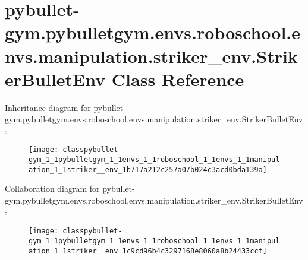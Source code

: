 \hypertarget{classpybullet-gym_1_1pybulletgym_1_1envs_1_1roboschool_1_1envs_1_1manipulation_1_1striker__env_1_1_striker_bullet_env}{}\section{pybullet-\/gym.pybulletgym.\+envs.\+roboschool.\+envs.\+manipulation.\+striker\+\_\+env.\+Striker\+Bullet\+Env Class Reference}
\label{classpybullet-gym_1_1pybulletgym_1_1envs_1_1roboschool_1_1envs_1_1manipulation_1_1striker__env_1_1_striker_bullet_env}


Inheritance diagram for pybullet-\/gym.pybulletgym.\+envs.\+roboschool.\+envs.\+manipulation.\+striker\+\_\+env.\+Striker\+Bullet\+Env\+:
\nopagebreak
\begin{figure}[H]
\begin{center}
\leavevmode
\texttt{[image: classpybullet-gym\_1\_1pybulletgym\_1\_1envs\_1\_1roboschool\_1\_1envs\_1\_1manipulation\_1\_1striker\_\_env\_1b717a212c257a07b024c3acd0bda139a]}
\end{center}
\end{figure}


Collaboration diagram for pybullet-\/gym.pybulletgym.\+envs.\+roboschool.\+envs.\+manipulation.\+striker\+\_\+env.\+Striker\+Bullet\+Env\+:
\nopagebreak
\begin{figure}[H]
\begin{center}
\leavevmode
\texttt{[image: classpybullet-gym\_1\_1pybulletgym\_1\_1envs\_1\_1roboschool\_1\_1envs\_1\_1manipulation\_1\_1striker\_\_env\_1c9cd96b4c3297168e8060a8b24433ccf]}
\end{center}
\end{figure}
